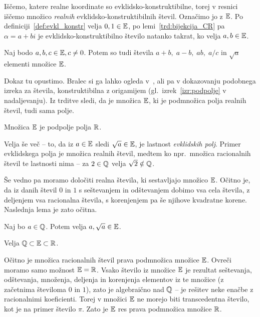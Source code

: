 Iščemo, katere realne koordinate so evklidsko-konstruktibilne, torej v resnici iščemo množico \emph{realnih} evklidsko-konstruktibilnih števil. Označimo jo z $\mathbb E$. Po definiciji~\ref{def:evkl_konstr} velja $0, 1 \in \mathbb E$, po lemi~\ref{trd:bijekcija_CR} pa $\alpha = a + bi$ je evklidsko-konstruktibilno število natanko takrat, ko velja $a, b \in \mathbb E$.

\begin{trditev}
    Naj bodo $a, b, c \in \mathbb E, c \neq 0$. Potem so tudi števila $a+b, \; a-b, \; ab, \; a/c$ in $\sqrt{a}$ elementi množice $\mathbb E$.
\end{trditev}

Dokaz tu opustimo. Bralec si ga lahko ogleda v~\cite{jerman1998}, \cite[str.\ 165--170]{michael2005} ali pa v dokazovanju podobnega izreka za števila, konstruktibilna z origamijem (gl.\ izrek~\ref{izr:podpolje} v nadaljevanju). Iz trditve sledi, da je množica $\mathbb E$, ki je podmnožica polja realnih števil, tudi sama polje.

\begin{posledica}
    Množica $\mathbb E$ je podpolje polja $\mathbb R$.
\end{posledica}

Velja še več -- to, da iz $a \in \mathbb E$ sledi $\sqrt{a} \in \mathbb E$, je lastnost \emph{evklidskih polj}. Primer evklidskega polja je množica realnih števil, medtem ko npr.\ množica racionalnih števil te lastnosti nima -- za $2 \in \mathbb Q$ velja $\sqrt{2} \notin \mathbb Q$.

Še vedno pa moramo določiti realna števila, ki sestavljajo množico $\mathbb E$. Očitno je, da iz danih števil $0$ in $1$ s seštevanjem in odštevanjem dobimo vsa cela števila, z deljenjem vsa racionalna števila, s korenjenjem pa še njihove kvadratne korene. Naslednja lema je zato očitna.

\begin{lema}
    Naj bo $a \in \mathbb Q$. Potem velja $a, \sqrt{a} \in \mathbb E$.
\end{lema}

\begin{posledica}
    \label{posl:podmnozice}
    Velja $\mathbb Q \subset \mathbb E \subset \mathbb R$.
\end{posledica}
\begin{dokaz}
    Očitno je množica racionalnih števil prava podmnožica množice $\mathbb E$. Ovreči moramo samo možnost $\mathbb E = \mathbb R$. Vsako število iz množice $\mathbb E$ je rezultat seštevanja, odštevanja, množenja, deljenja in korenjenja elementov iz te množice (z začetnima številoma $0$ in $1$), zato je algebraično nad $\mathbb Q$ -- je rešitev neke enačbe z racionalnimi koeficienti. Torej v množici $\mathbb E$ ne morejo biti transcedentna število, kot je na primer število $\pi$. Zato je $\mathbb E$ res prava podmnožica množice $\mathbb R$.
\end{dokaz}

